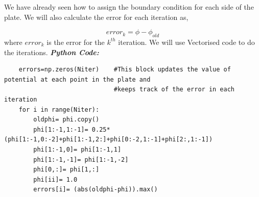 \documentclass{article}
\begin{document}
  We have already seen how to assign the boundary condition for each side of the plate. We will also 
  calculate the error for each iteration as,
   
   \begin{equation}
    error_k = \phi- \phi_{old}
   \end{equation}
   where $error_k$ is the error for the $k^{th}$ iteration. We will use Vectorised code to do the iterations.\newline
    \textit{\textbf{Python Code:}}
    \lstset{language=Python}
    \lstset{basicstyle=\footnotesize}
    \begin{lstlisting}
    errors=np.zeros(Niter)    #This block updates the value of potential at each point in the plate and
                              #keeps track of the error in each iteration
    for i in range(Niter):
        oldphi= phi.copy()
        phi[1:-1,1:-1]= 0.25*(phi[1:-1,0:-2]+phi[1:-1,2:]+phi[0:-2,1:-1]+phi[2:,1:-1])
        phi[1:-1,0]= phi[1:-1,1] 
        phi[1:-1,-1]= phi[1:-1,-2] 
        phi[0,:]= phi[1,:] 
        phi[ii]= 1.0
        errors[i]= (abs(oldphi-phi)).max()
    \end{lstlisting}


 
\end{document}

